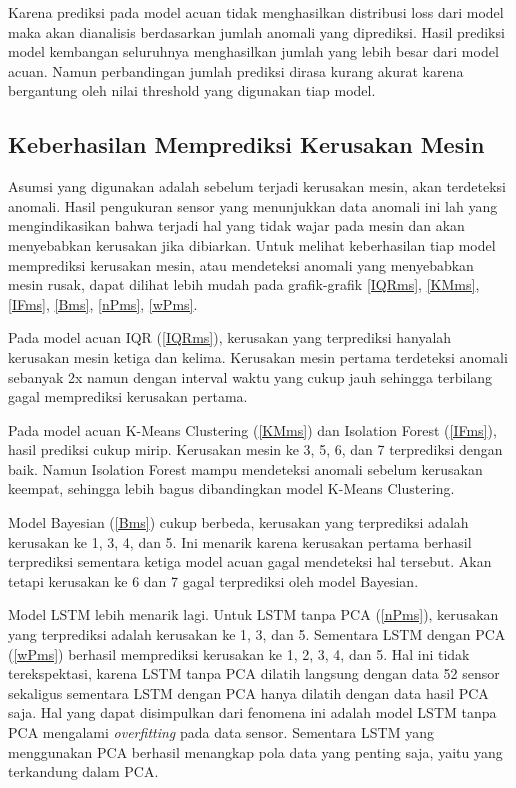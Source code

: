     Karena prediksi pada model acuan tidak menghasilkan distribusi loss dari model maka akan dianalisis berdasarkan jumlah anomali yang diprediksi. Hasil prediksi model kembangan seluruhnya menghasilkan jumlah yang lebih besar dari model acuan. Namun perbandingan jumlah prediksi dirasa kurang akurat karena bergantung oleh nilai threshold yang digunakan tiap model.

    \subsection{Keberhasilan Memprediksi Kerusakan Mesin}

    Asumsi yang digunakan adalah sebelum terjadi kerusakan mesin, akan terdeteksi anomali. Hasil pengukuran sensor yang menunjukkan data anomali ini lah yang mengindikasikan bahwa terjadi hal yang tidak wajar pada mesin dan akan menyebabkan kerusakan jika dibiarkan. Untuk melihat keberhasilan tiap model memprediksi kerusakan mesin, atau mendeteksi anomali yang menyebabkan mesin rusak, dapat dilihat lebih mudah pada grafik-grafik \ref{IQRms}, \ref{KMms}, \ref{IFms}, \ref{Bms}, \ref{nPms}, \ref{wPms}.

    Pada model acuan IQR (\ref{IQRms}), kerusakan yang terprediksi hanyalah kerusakan mesin ketiga dan kelima. Kerusakan mesin pertama terdeteksi anomali sebanyak 2x namun dengan interval waktu yang cukup jauh sehingga terbilang gagal memprediksi kerusakan pertama.

    Pada model acuan K-Means Clustering (\ref{KMms}) dan Isolation Forest (\ref{IFms}), hasil prediksi cukup mirip. Kerusakan mesin ke 3, 5, 6, dan 7 terprediksi dengan baik. Namun Isolation Forest mampu mendeteksi anomali sebelum kerusakan keempat, sehingga lebih bagus dibandingkan model K-Means Clustering.

    Model Bayesian (\ref{Bms}) cukup berbeda, kerusakan yang terprediksi adalah kerusakan ke 1, 3, 4, dan 5. Ini menarik karena kerusakan pertama berhasil terprediksi sementara ketiga model acuan gagal mendeteksi hal tersebut. Akan tetapi kerusakan ke 6 dan 7 gagal terprediksi oleh model Bayesian.

    Model LSTM lebih menarik lagi. Untuk LSTM tanpa PCA (\ref{nPms}), kerusakan yang terprediksi adalah kerusakan ke 1, 3, dan 5. Sementara LSTM dengan PCA (\ref{wPms}) berhasil memprediksi kerusakan ke 1, 2, 3, 4, dan 5. Hal ini tidak terekspektasi, karena LSTM tanpa PCA dilatih langsung dengan data 52 sensor sekaligus sementara LSTM dengan PCA hanya dilatih dengan data hasil PCA saja. Hal yang dapat disimpulkan dari fenomena ini adalah model LSTM tanpa PCA mengalami \emph{overfitting} pada data sensor. Sementara LSTM yang menggunakan PCA berhasil menangkap pola data yang penting saja, yaitu yang terkandung dalam PCA.

